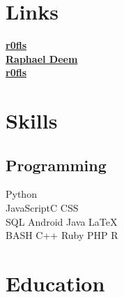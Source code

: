 \documentclass[]{deemweaver}
\begin{document}
%
%
\lastupdated

%
%


%
%

\begin{minipage}[t]{0.33\textwidth} 


\section{Links} 
{\FA \faGithub} \href{https://github.com/r0fls}{\bf r0fls} \\
{\FA \faLinkedin} \href{https://www.linkedin.com/in/raphael-deem-5757ba31}{\bf Raphael Deem} \\
{\FA \faStackOverflow}  \href{http://stackoverflow.com/users/1318734/rofls}{\bf r0fls} \\


\section{Skills}
\subsection{Programming}
Python \\
JavaScript\textbullet{}C \textbullet{}CSS \\
SQL \textbullet{}Android \textbullet{}Java \textbullet{}\LaTeX\ \\
BASH \textbullet{}C++ \textbullet{}Ruby \textbullet{}PHP \textbullet{}R\\ 
\sectionsep



\section{Education} 


\end{minipage}
\end{document}
